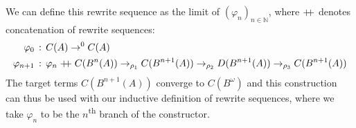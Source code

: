 We can define this rewrite sequence as the limit of
$(\varphi_n)_{n \in \mathbb{N}}$, where $\mathrel{+\!\!+}$ denotes
concatenation of rewrite sequences:
\begin{align*}
  \varphi_0 \, &: \, C(A) \to^0 C(A)\\ %
  \varphi_{n + 1} \, &: \, \varphi_n \concat C(B^n(A)) \to_{\rho_1}
  C(B^{n + 1}(A)) \to_{\rho_2} D(B^{n + 1}(A)) \to_{\rho_3} C(B^{n +
    1}(A))
\end{align*}
The target terms $C(B^{n + 1}(A))$ converge to $C(B^\omega)$ and this
construction can thus be used with our inductive definition of rewrite
sequences, where we take $\varphi_n$ to be the $n$\textsuperscript{th}
branch of the 
constructor.



